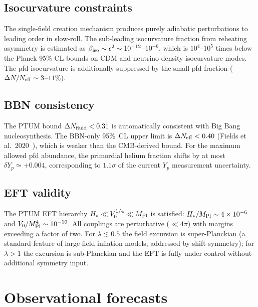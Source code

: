 \documentclass[epj]{svjour}
\begin{document}
\subsection{Isocurvature constraints}

The single-field creation mechanism produces purely adiabatic
perturbations to leading order in slow-roll. The sub-leading
isocurvature fraction from reheating asymmetry is estimated as
\(\beta_{\rm iso}\sim\epsilon^2\sim10^{-12}\)--\(10^{-6}\), which
is \(10^4\)--\(10^5\) times below the Planck 95\% CL bounds on
CDM and neutrino density isocurvature modes. The pfd isocurvature
is additionally suppressed by the small pfd fraction
(\(\Delta N/N_{\rm eff}\sim3\)--\(11\%\)).

\subsection{BBN consistency}

The PTUM bound \(\Delta N_{\rm fluid}<0.31\) is automatically
consistent with Big Bang nucleosynthesis. The BBN-only 95\%~CL
upper limit is \(\Delta N_{\rm eff}<0.40\)
(Fields et al.\ 2020~\cite{Fields2020}), which is weaker than the
CMB-derived bound. For the maximum allowed pfd abundance, the
primordial helium fraction shifts by at most
\(\delta Y_p\simeq+0.004\), corresponding to \(1.1\sigma\) of the
current \(Y_p\) measurement uncertainty.

\subsection{EFT validity}
\label{sec:eft_validity}

The PTUM EFT hierarchy \(H_*\ll V_0^{1/4}\ll M_{\rm Pl}\) is
satisfied: \(H_*/M_{\rm Pl}\sim4\times10^{-6}\) and
\(V_0/M_{\rm Pl}^4\sim10^{-10}\). All couplings are perturbative
(\(\ll4\pi\)) with margins exceeding a factor of two. For
\(\lambda\lesssim0.5\) the field excursion is super-Planckian
(a standard feature of large-field inflation models, addressed by
shift symmetry); for \(\lambda>1\) the excursion is sub-Planckian
and the EFT is fully under control without additional symmetry
input.

\section{Observational forecasts}
\label{sec:forecast}
\end{document}
